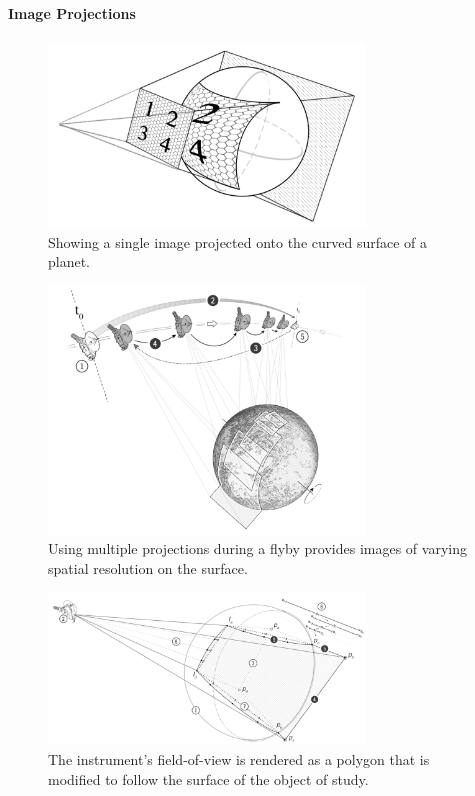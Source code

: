 \paragraph{Image Projections} \label{contributions:astro:sc:projections}
\begin{figure}
\centering
\includegraphics[width=0.75\textwidth]{figures/contributions/sc/single_projection.png}
\caption{Showing a single image projected onto the curved surface of a planet.}
\label{contributions:astro:sc:singleprojection}
\end{figure}

\begin{figure}
\centering
\includegraphics[width=0.75\textwidth]{figures/contributions/sc/new_horizons_projection.png}
\caption{Using multiple projections during a flyby provides images of varying spatial resolution on the surface.}
\label{contributions:astro:sc:newhorizonsprojection}
\end{figure}

\begin{figure}
\centering
\includegraphics[width=0.75\textwidth]{figures/contributions/sc/intercept.png}
\caption{The instrument's field-of-view is rendered as a polygon that is modified to follow the surface of the object of study.}
\label{contributions:astro:sc:intercept}
\end{figure}


